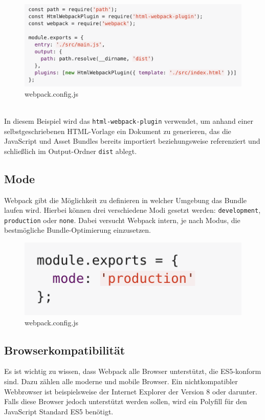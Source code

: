 \begin{figure}[H]
	\begin{center}
		\includegraphics[scale=.7]{images/webpack-plugins.png}
	\end{center}
		\caption{webpack.config.js}
\end{figure}

\mbox{}\\
In diesem Beispiel wird das \texttt{html-webpack-plugin} verwendet, um anhand einer selbstgeschriebenen HTML-Vorlage ein Dokument zu generieren, das die JavaScript und Asset Bundles bereits importiert beziehungsweise referenziert und schließlich  im Output-Ordner \texttt{dist} ablegt.

\subsection{Mode}
Webpack gibt die Möglichkeit zu definieren in welcher Umgebung das Bundle laufen wird. Hierbei können drei verschiedene Modi gesetzt werden: \texttt{development}, \texttt{production} oder \texttt{none}. Dabei versucht Webpack intern, je nach Modus, die bestmögliche Bundle-Optimierung einzusetzen.

\begin{figure}[H]
	\begin{center}
		\includegraphics[scale=.7]{images/webpack-mode.png}
	\end{center}
		\caption{webpack.config.js}
\end{figure}

\newpage
\subsection{Browserkompatibilität}
Es ist wichtig zu wissen, dass Webpack alle Browser unterstützt, die ES5-konform sind. Dazu zählen alle moderne und mobile Browser. Ein nichtkompatibler Webbrowser ist beispielsweise der Internet Explorer der Version 8 oder darunter. Falls diese Browser jedoch unterstützt werden sollen, wird ein Polyfill für den JavaScript Standard ES5 benötigt.










